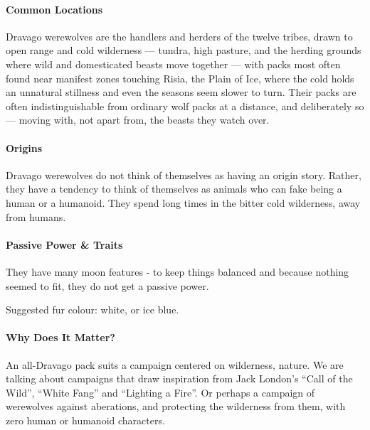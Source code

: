 \documentclass[twocolumn]{dndbook}
\begin{document}
\paragraph*{Common Locations} Dravago werewolves are the handlers and herders of the twelve tribes, drawn to open range and cold wilderness --- tundra, high pasture, and the herding grounds where wild and domesticated beasts move together --- with packs most often found near manifest zones touching Risia, the Plain of Ice, where the cold holds an unnatural stillness and even the seasons seem slower to turn.
Their packs are often indistinguishable from ordinary wolf packs at a distance, and deliberately so --- moving with, not apart from, the beasts they watch over.

\paragraph*{Origins} Dravago werewolves do not think of themselves as having an origin story. Rather, they have a tendency to think of themselves as animals who can fake being a human or a humanoid.
They spend long times in the bitter cold wilderness, away from humans.

\paragraph*{Passive Power \& Traits} They have many moon features - to keep things balanced and because nothing seemed to fit, they do not get a passive power.

Suggested fur colour: white, or ice blue.

\paragraph*{Why Does It Matter?} An all-Dravago pack suits a campaign centered on wilderness, nature.
We are talking about campaigns that draw inspiration from Jack London's ``Call of the Wild'', ``White Fang'' and ``Lighting a Fire''.
Or perhaps a campaign of werewolves against aberations, and protecting the wilderness from them, with zero human or humanoid characters.\par
\end{document}
